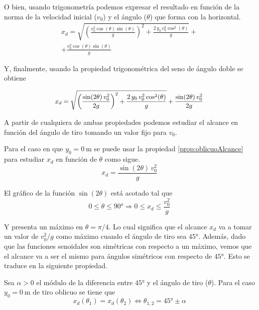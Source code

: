 O bien, usando trigonometría podemos expresar el resultado en función de la norma de la velocidad inicial ($v_0$) y el ángulo ($\theta$) que forma con la horizontal.
\begin{multline*}
    x_d = \sqrt{\left(\frac{v_0^2 \cos(\theta) \sin(\theta)}{g}\right)^2 + \frac{2 \, y_0 \, v_0^2 \cos^2(\theta)}{g}} +
    \\ + \frac{v_0^2 \cos(\theta) \sin(\theta)}{g}
\end{multline*}

Y, finalmente, usando la propiedad trigonométrica del seno de ángulo doble se obtiene

\begin{mdframed}[style=PropertyFrame]
    \begin{prop}
    \end{prop}
    \begin{equation*}
        \scale{0.94}{
        x_d = \sqrt{\left(\frac{\sin(2\theta) \, v_0^2}{2g}\right)^2 + \frac{2 \, y_0 \, v_0^2 \cos^2(\theta)}{g}} + \frac{\sin(2\theta) \, v_0^2}{2g}
        }
    \end{equation*}
\end{mdframed}

A partir de cualquiera de ambas propiedades podemos estudiar el alcance en función del ángulo de tiro tomando un valor fijo para $v_0$.

Para el caso en que $y_0 = \SI{0}{\metre}$ se puede usar la propiedad \ref{prop:oblicuoAlcance} para estudiar $x_d$ en función de $\theta$ como sigue.
\begin{equation*}
    x_d = \frac{\sin(2\theta) \, v_0^2}{g}
\end{equation*}

El gráfico de la función $\sin(2\theta)$ está acotado tal que
\begin{equation*}
    0 \leq \theta \leq \ang{90} \Rightarrow 0 \leq x_d \leq \frac{v_0^2}{g}
\end{equation*}

Y presenta un máximo en $\theta=\pi/4$.
Lo cual significa que el alcance $x_d$ va a tomar un valor de $v_0^2/g$ como máximo cuando el ángulo de tiro sea $\ang{45}$.
Además, dado que las funciones senoidales son simétricas con respecto a un máximo, vemos que el alcance va a ser el mismo para ángulos simétricos con respecto de $\ang{45}$.
Esto se traduce en la siguiente propiedad.

\begin{mdframed}[style=PropertyFrame]
    \begin{prop}
    \end{prop}
    Sea $\alpha>0$ el módulo de la diferencia entre $\ang{45}$ y el ángulo de tiro ($\theta$).
    Para el caso $y_0 = \SI{0}{\metre}$ de tiro oblicuo se tiene que
    \begin{equation*}
        x_d(\theta_1) = x_d(\theta_2) \iff \theta_{1,2} = \ang{45} \pm \alpha
    \end{equation*}
\end{mdframed}

